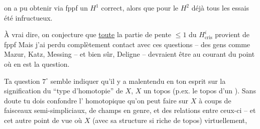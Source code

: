 on a pu obtenir via fppf un $H^1$ correct, alors que pour le $H^2$ déjà tous les essais  été infructueux.

À vrai dire, on conjecture que \uline{toute} la partie de pente $\leq 1$ du $H^i_{\mathrm{cris}}$ provient de fppf Mais j'ai perdu complètement contact avec ces questions -- des gens comme Mazur, Katz, Messing -- et bien sûr, Deligne -- devraient être au courant du point où en est la question.


Ta question $7^{\circ}$ semble indiquer qu'il y a malentendu en ton esprit sur la signification du ``type d'homotopie'' de $X$, $X$ un topos (p.ex. le topos  d'un ). Sans doute tu dois confondre l' homotopique qu'on peut faire sur $X$ à coups de faisceaux semi-simpliciaux, de champs en  genre, et des relations entre ceux-ci -- et cet autre point de vue où $X$ (avec sa structure si riche de topos)  virtuellement,
